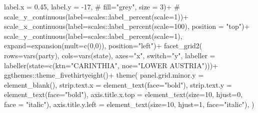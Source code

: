 \documentclass[
  letterpaper,
  DIV=11,
  numbers=noendperiod,
  oneside]{scrartcl}
\newenvironment{Shaded}{\begin{snugshade}}{\end{snugshade}}
\newcommand{\AttributeTok}[1]{\textcolor[rgb]{0.40,0.45,0.13}{#1}}
\newcommand{\CommentTok}[1]{\textcolor[rgb]{0.37,0.37,0.37}{#1}}
\newcommand{\DecValTok}[1]{\textcolor[rgb]{0.68,0.00,0.00}{#1}}
\newcommand{\FloatTok}[1]{\textcolor[rgb]{0.68,0.00,0.00}{#1}}
\newcommand{\FunctionTok}[1]{\textcolor[rgb]{0.28,0.35,0.67}{#1}}
\newcommand{\NormalTok}[1]{\textcolor[rgb]{0.00,0.23,0.31}{#1}}
\newcommand{\SpecialCharTok}[1]{\textcolor[rgb]{0.37,0.37,0.37}{#1}}
\newcommand{\StringTok}[1]{\textcolor[rgb]{0.13,0.47,0.30}{#1}}
\begin{document}
\begin{Shaded}
\begin{Highlighting}[]
                        \AttributeTok{label.x =} \FloatTok{0.45}\NormalTok{, }
                        \AttributeTok{label.y =} \SpecialCharTok{{-}}\DecValTok{17}\NormalTok{, }
           \CommentTok{\#             fill="grey",}
                        \AttributeTok{size =} \DecValTok{3}\NormalTok{)}\SpecialCharTok{+}
  \CommentTok{\# scale\_y\_continuous(label=scales::label\_percent(scale=1))+}
  \FunctionTok{scale\_x\_continuous}\NormalTok{(}\AttributeTok{label=}\NormalTok{scales}\SpecialCharTok{::}\FunctionTok{label\_percent}\NormalTok{(}\AttributeTok{scale=}\DecValTok{100}\NormalTok{),}
  \AttributeTok{position =} \StringTok{"top"}\NormalTok{)}\SpecialCharTok{+}
  \FunctionTok{scale\_y\_continuous}\NormalTok{(}\AttributeTok{label=}\NormalTok{scales}\SpecialCharTok{::}\FunctionTok{label\_percent}\NormalTok{(}\AttributeTok{scale=}\DecValTok{1}\NormalTok{),}
                     \AttributeTok{expand=}\FunctionTok{expansion}\NormalTok{(}\AttributeTok{mult=}\FunctionTok{c}\NormalTok{(}\DecValTok{0}\NormalTok{,}\DecValTok{0}\NormalTok{)),}
                     \AttributeTok{position=}\StringTok{"left"}\NormalTok{)}\SpecialCharTok{+}
  \FunctionTok{facet\_grid2}\NormalTok{(}
    \AttributeTok{rows=}\FunctionTok{vars}\NormalTok{(party),}
    \AttributeTok{cols=}\FunctionTok{vars}\NormalTok{(state),}
    \AttributeTok{axes=}\StringTok{"x"}\NormalTok{,}
    \AttributeTok{switch=}\StringTok{"y"}\NormalTok{,}
    \AttributeTok{labeller =} \FunctionTok{labeller}\NormalTok{(}\AttributeTok{state=}\FunctionTok{c}\NormalTok{(}\AttributeTok{ktn=}\StringTok{"CARINTHIA"}\NormalTok{, }\AttributeTok{noe=}\StringTok{"LOWER AUSTRIA"}\NormalTok{)))}\SpecialCharTok{+}
\NormalTok{  ggthemes}\SpecialCharTok{::}\FunctionTok{theme\_fivethirtyeight}\NormalTok{()}\SpecialCharTok{+}
  \FunctionTok{theme}\NormalTok{(}
    \AttributeTok{panel.grid.minor.y =} \FunctionTok{element\_blank}\NormalTok{(),}
    \AttributeTok{strip.text.x =} \FunctionTok{element\_text}\NormalTok{(}\AttributeTok{face=}\StringTok{"bold"}\NormalTok{),}
    \AttributeTok{strip.text.y =} \FunctionTok{element\_text}\NormalTok{(}\AttributeTok{face=}\StringTok{"bold"}\NormalTok{),}
    \AttributeTok{axis.title.x.top =} \FunctionTok{element\_text}\NormalTok{(}\AttributeTok{size=}\DecValTok{10}\NormalTok{, }\AttributeTok{hjust=}\DecValTok{0}\NormalTok{, }\AttributeTok{face =} \StringTok{"italic"}\NormalTok{),}
    \AttributeTok{axis.title.y.left =} \FunctionTok{element\_text}\NormalTok{(}\AttributeTok{size=}\DecValTok{10}\NormalTok{, }\AttributeTok{hjust=}\DecValTok{1}\NormalTok{,}
    \AttributeTok{face=}\StringTok{"italic"}\NormalTok{),}
\NormalTok{  )}
\end{Highlighting}
\end{Shaded}
\end{document}
